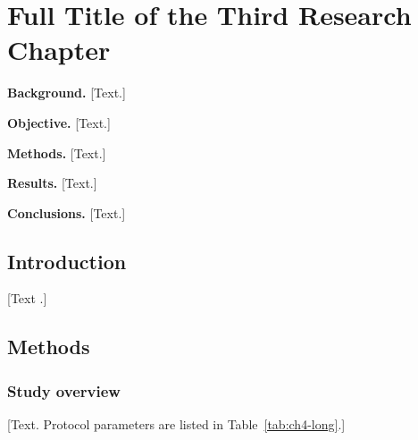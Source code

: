 \chapter{Full Title of the Third Research Chapter}
\setcounter{figure}{0}
\renewcommand{\thefigure}{\thechapter.\arabic{figure}}


\begin{chapterabstract}
\noindent\textbf{Background.}
[Text.]

\noindent\textbf{Objective.}
[Text.]

\noindent\textbf{Methods.}
[Text.]

\noindent\textbf{Results.}
[Text.]

\noindent\textbf{Conclusions.}
[Text.]
\end{chapterabstract}

\section{Introduction}
[Text \citep{placeholderArticle2024}.]

\section{Methods}
\subsection{Study overview}
[Text. Protocol parameters are listed in Table~\ref{tab:ch4-long}.]

